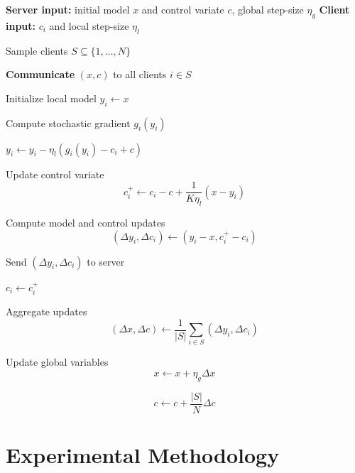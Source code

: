 \documentclass[12pt]{book}
\begin{document}
\vspace{-5cm}
\begin{algorithm}[H]
\caption{SCAFFOLD: Stochastic Controlled Averaging for Federated Learning}
\label{alg:scaffold}
\begin{algorithmic}[1]

\STATE \textbf{Server input:} initial model $x$ and control variate $c$, global step-size $\eta_g$
\STATE \textbf{Client input:} $c_i$ and local step-size $\eta_l$


\STATE Sample clients $S \subseteq \{1,\dots,N\}$

\STATE \textbf{Communicate} $(x, c)$ to all clients $i \in S$


\STATE Initialize local model $y_i \leftarrow x$


\STATE Compute stochastic gradient $g_i(y_i)$

\STATE $y_i \leftarrow y_i - \eta_l (g_i(y_i) - c_i + c)$

\ENDFOR

\STATE Update control variate
\[
c_i^{+} \leftarrow c_i - c + \frac{1}{K\eta_l}(x - y_i)
\]

\STATE Compute model and control updates
\[
(\Delta y_i, \Delta c_i) \leftarrow (y_i - x, c_i^{+} - c_i)
\]

\STATE Send $(\Delta y_i, \Delta c_i)$ to server

\STATE $c_i \leftarrow c_i^{+}$

\ENDFOR

\STATE Aggregate updates
\[
(\Delta x, \Delta c) \leftarrow 
\frac{1}{|S|} \sum_{i \in S} (\Delta y_i, \Delta c_i)
\]

\STATE Update global variables
\[
x \leftarrow x + \eta_g \Delta x
\]

\[
c \leftarrow c + \frac{|S|}{N} \Delta c
\]

\ENDFOR

\end{algorithmic}
\end{algorithm}

\chapter{Experimental Methodology}
\end{document}
